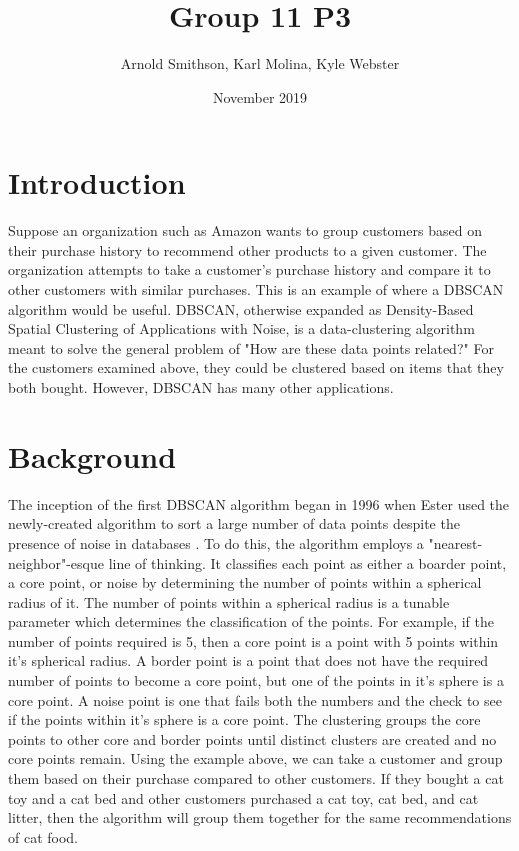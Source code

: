 \documentclass{article}
\title{Group 11 P3}
\author{Arnold Smithson, Karl Molina, Kyle Webster}
\date{November 2019}
\begin{document}
\maketitle

\section{Introduction}

Suppose an organization such as Amazon wants to group customers based on their purchase history to recommend other products to a given customer. The organization attempts to take a customer's purchase history and compare it to other customers with similar purchases. This is an example of where a DBSCAN algorithm would be useful. DBSCAN, otherwise expanded as Density-Based Spatial Clustering of Applications with Noise, is a data-clustering algorithm meant to solve the general problem of "How are these data points related?" For the customers examined above, they could be clustered based on items that they both bought. However, DBSCAN has many other applications.

\section{Background}

The inception of the first DBSCAN algorithm began in 1996 when Ester used the newly-created algorithm to sort a large number of data points despite the presence of noise in databases \cite{ester1996density}. To do this, the algorithm employs a "nearest-neighbor"-esque line of thinking. It classifies each point as either a boarder point, a core point, or noise by determining the number of points within a spherical radius of it. The number of points within a spherical radius is a tunable parameter which determines the classification of the points. For example, if the number of points required is 5, then a core point is a point with 5 points within it's spherical radius. A border point is a point that does not have the required number of points to become a core point, but one of the points in it's sphere is a core point. A noise point is one that fails both the numbers and the check to see if the points within it's sphere is a core point. The clustering groups the core points to other core and border points until distinct clusters are created and no core points remain. Using the example above, we can take a customer and group them based on their purchase compared to other customers. If they bought a cat toy and a cat bed and other customers purchased a cat toy, cat bed, and cat litter, then the algorithm will group them together for the same recommendations of cat food. 
\end{document}
